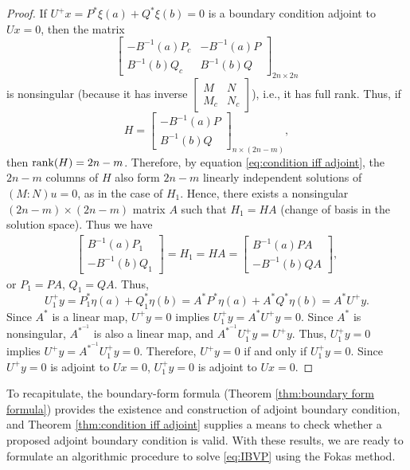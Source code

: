 \documentclass[12pt, oneside, a4paper]{article}
\begin{document}
\begin{proof}
    If $U^+x=P^*\xi(a) + Q^*\xi(b)=0$ is a boundary condition adjoint to $Ux=0$, then the matrix
    \[\begin{bmatrix}
        -B^{-1}(a)P_c & -B^{-1}(a)P\\
        B^{-1}(b)Q_c & B^{-1}(b)Q
    \end{bmatrix}_{2n\times 2n}\]
is nonsingular (because it has inverse $\begin{bmatrix}M & N\\ M_c & N_c\end{bmatrix}$), i.e., it has full rank. Thus, if 
    \[H = \begin{bmatrix}
        -B^{-1}(a)P\\
        B^{-1}(b)Q
    \end{bmatrix}_{n\times (2n-m)},\]
    then $\operatorname{rank}(H)=2n-m$. Therefore, by equation \eqref{eq:condition iff adjoint}, the $2n-m$ columns of $H$ also form $2n-m$ linearly independent solutions of $(M:N)u=0$, as in the case of $H_1$. Hence, there exists a nonsingular $(2n-m)\times (2n-m)$ matrix $A$ such that $H_1=HA$ (change of basis in the solution space). 
    Thus we have
    \begin{align*}
        \begin{bmatrix}
            B^{-1}(a)P_1\\
            -B^{-1}(b)Q_1
        \end{bmatrix} = H_1 = HA = \begin{bmatrix}
            B^{-1}(a)PA\\
            -B^{-1}(b)QA
        \end{bmatrix},
    \end{align*}
    or $P_1=PA$, $Q_1=QA$. Thus, 
    \[U_1^+y = P_1^*\eta(a) + Q_1^*\eta(b) = A^*P^*\eta(a) + A^*Q^*\eta(b)= A^* U^+y.\]
    Since $A^*$ is a linear map, $U^+y=0$ implies $U_1^+y=A^*U^+y=0$. Since $A^*$ is nonsingular, $A^{*^{-1}}$ is also a linear map, and $A^{*^{-1}}U_1^+y = U^+y$. Thus, $U_1^+y=0$ implies $U^+y=A^{*^{-1}}U_1^+y=0$. Therefore, $U^+y=0$ if and only if $U_1^+y=0$. Since $U^+y=0$ is adjoint to $Ux=0$, $U_1^+y=0$ is adjoint to $Ux=0$.
\end{proof}

To recapitulate, the boundary-form formula (Theorem \ref{thm:boundary form formula}) provides the existence and construction of adjoint boundary condition, and Theorem \ref{thm:condition iff adjoint} supplies a means to check whether a proposed adjoint boundary condition is valid. With these results, we are ready to formulate an algorithmic procedure to solve \eqref{eq:IBVP} using the Fokas method.
\end{document}
